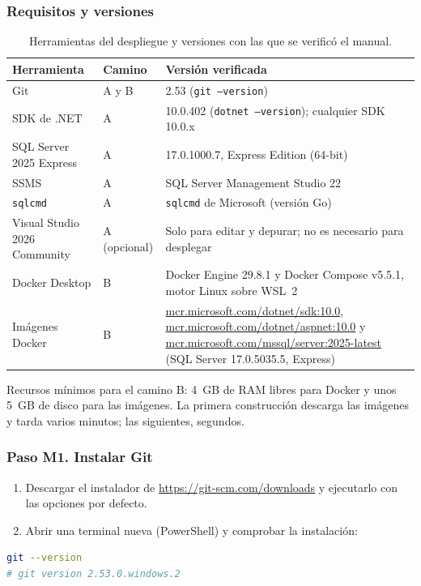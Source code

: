 \documentclass[12pt,letterpaper]{article}
\begin{document}
\subsubsection{Requisitos y versiones}

\begin{table}[H]
\centering
\caption{Herramientas del despliegue y versiones con las que se verificó el manual.}
\label{tab:manual-versiones}
\begin{tabularx}{\textwidth}{l l X}
\toprule
\textbf{Herramienta} & \textbf{Camino} & \textbf{Versión verificada} \\
\midrule
Git                         & A y B & 2.53 (\texttt{git --version}) \\
SDK de .NET                 & A     & 10.0.402 (\texttt{dotnet --version}); cualquier SDK 10.0.x \\
SQL Server 2025 Express     & A     & 17.0.1000.7, Express Edition (64-bit) \\
SSMS                        & A     & SQL Server Management Studio 22 \\
\texttt{sqlcmd}             & A     & \texttt{sqlcmd} de Microsoft (versión Go) \\
Visual Studio 2026 Community & A (opcional) & Solo para editar y depurar; no es necesario para desplegar \\
Docker Desktop              & B     & Docker Engine 29.8.1 y Docker Compose v5.5.1, motor Linux sobre WSL~2 \\
Imágenes Docker             & B     & \url{mcr.microsoft.com/dotnet/sdk:10.0},
                                      \url{mcr.microsoft.com/dotnet/aspnet:10.0} y
                                      \url{mcr.microsoft.com/mssql/server:2025-latest}
                                      (SQL Server 17.0.5035.5, Express) \\
\bottomrule
\end{tabularx}
\end{table}

Recursos mínimos para el camino B: 4~GB de RAM libres para Docker y unos 5~GB de disco
para las imágenes. La primera construcción descarga las imágenes y tarda varios
minutos; las siguientes, segundos.

\subsubsection{Paso M1. Instalar Git}
\begin{enumerate}[itemsep=2pt]
  \item Descargar el instalador de \url{https://git-scm.com/downloads} y ejecutarlo con
        las opciones por defecto.
  \item Abrir una terminal nueva (PowerShell) y comprobar la instalación:
\end{enumerate}
\begin{lstlisting}[language=bash,numbers=none]
git --version
# git version 2.53.0.windows.2
\end{lstlisting}
\end{document}
